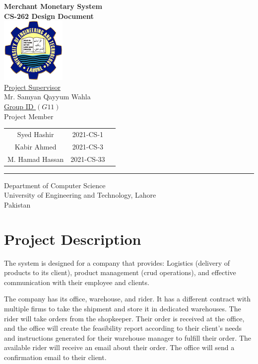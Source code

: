 \documentclass[12pt,a4paper]{report}
\begin{document}
\begin{center}
\textbf{\large{Merchant Monetary System}}\\
\vspace{0.5cm}
\textbf{ CS-262 Design Document} \\
\vspace{1.5cm}
\includegraphics[scale=.07]{UETLogo}\\
\vspace{1.5cm}
\underline{ Project Supervisor}\\
\vspace{0.5cm}
Mr. Samyan Qayyum Wahla\\
\vspace{1cm}
\underline {Group ID $(G 11)$} \\
\vspace{0.5cm}
Project Member\\
\vspace{0.5cm}
\begin{tabular}{c c c }
 Syed Hashir & 2021-CS-1 \\ 
 Kabir Ahmed & 2021-CS-3  \\  
 M. Hamad Hassan & 2021-CS-33
\end{tabular}
\vspace{2cm}
\par\rule{\textwidth}{0.5pt} 
Department of Computer Science\\
University of Engineering and Technology, Lahore\\
Pakistan
\end{center}

\newpage
\chapter {Project Description}


The system is designed for a company that provides:
Logistics (delivery of products to its client), product management (crud operations), and effective communication with their employee and clients.
 
The company has its office, warehouse, and rider. 
It has a different contract with multiple firms to take the shipment and store it in dedicated warehouses. The rider will take orders from the shopkeeper. Their order is received at the office, and the office will create the feasibility report according to their client's needs and instructions generated for their warehouse manager to fulfill their order. The available rider will receive an email about their order. The office will send a confirmation email to their client. 
 
\end{document}
